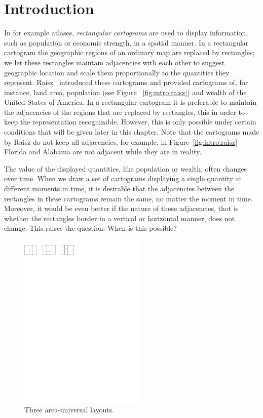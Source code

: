 
\section{Introduction}
\thispagestyle{plain}


  In for example atlases, \emph{rectangular cartograms} are used to display information, such as population or economic strength, in a spatial manner.
  In a rectangular cartogram  the geographic regions of an ordinary map are replaced by rectangles; we let these rectangles maintain adjacencies with each other to suggest geographic location and scale them proportionally to the quantities they represent.
  Raisz~\cite{Raisz1934} introduced these cartograms and provided cartograms of, for instance, land area, population (see Figure~ \ref{fig:intro:raisz}) and wealth of the United States of America.
  In a rectangular cartogram it is preferable to maintain the adjacencies of the regions that are replaced by rectangles, this in order to keep the representation recognizable.
  However, this is only possible under certain conditions that will be given later in this chapter.
  Note that the cartograms made by Raisz do not keep all adjacencies, for example, in Figure~\ref{fig:intro:raisz} Florida and Alabama are not adjacent while they are in reality.

  The value of the displayed quantities, like population or wealth, often changes over time.
  When we draw a set of cartograms displaying a single quantity at different moments in time, it is desirable that the adjacencies between the rectangles in these cartograms remain the same, no matter the moment in time.
  Moreover, it would be even better if the nature of these adjacencies, that is whether the rectangles border in a vertical or horizontal manner, does not change.
  This raises the question: When is this possible?

  \begin{figure} %
    \centering
    \includegraphics[width = 6cm]{introduction/img/areaunivLayout.pdf}
    \caption{Three area-universal layouts.}
    \label{fig:intro:areaunivLayout}
  \end{figure}

